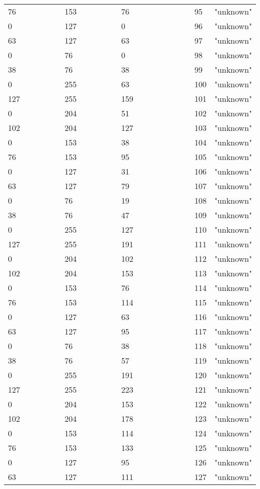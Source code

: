 \begin{longtable}{p{0.3\linewidth} p{0.3\linewidth} p{0.4\linewidth}}
 76 &  153 &   76 &   95 &  "unknown"\\
  0 &  127 &    0 &   96 &  "unknown"\\
 63 &  127 &   63 &   97 &  "unknown"\\
  0 &   76 &    0 &   98 &  "unknown"\\
 38 &   76 &   38 &   99 &  "unknown"\\
  0 &  255 &   63 &  100 &  "unknown"\\
127 &  255 &  159 &  101 &  "unknown"\\
  0 &  204 &   51 &  102 &  "unknown"\\
102 &  204 &  127 &  103 &  "unknown"\\
  0 &  153 &   38 &  104 &  "unknown"\\
 76 &  153 &   95 &  105 &  "unknown"\\
  0 &  127 &   31 &  106 &  "unknown"\\
 63 &  127 &   79 &  107 &  "unknown"\\
  0 &   76 &   19 &  108 &  "unknown"\\
 38 &   76 &   47 &  109 &  "unknown"\\
  0 &  255 &  127 &  110 &  "unknown"\\
127 &  255 &  191 &  111 &  "unknown"\\
  0 &  204 &  102 &  112 &  "unknown"\\
102 &  204 &  153 &  113 &  "unknown"\\
  0 &  153 &   76 &  114 &  "unknown"\\
 76 &  153 &  114 &  115 &  "unknown"\\
  0 &  127 &   63 &  116 &  "unknown"\\
 63 &  127 &   95 &  117 &  "unknown"\\
  0 &   76 &   38 &  118 &  "unknown"\\
 38 &   76 &   57 &  119 &  "unknown"\\
  0 &  255 &  191 &  120 &  "unknown"\\
127 &  255 &  223 &  121 &  "unknown"\\
  0 &  204 &  153 &  122 &  "unknown"\\
102 &  204 &  178 &  123 &  "unknown"\\
  0 &  153 &  114 &  124 &  "unknown"\\
 76 &  153 &  133 &  125 &  "unknown"\\
  0 &  127 &   95 &  126 &  "unknown"\\
 63 &  127 &  111 &  127 &  "unknown"\\

\end{longtable}
